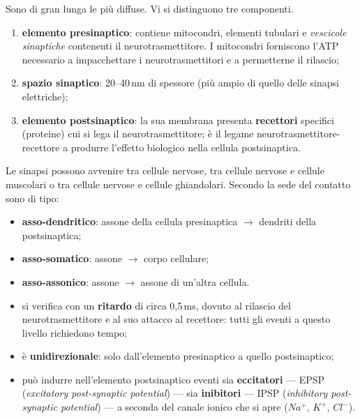Sono di gran lunga le più diffuse. Vi si distinguono tre componenti.
\begin{enumerate}
  \item \textbf{elemento presinaptico}: contiene mitocondri, elementi tubulari e \textit{vescicole
    sinaptiche} contenenti il neurotrasmettitore. I mitocondri forniscono l'ATP necessario a
    impacchettare i neurotrasmettitori e a permetterne il rilascio;
  \item \textbf{spazio sinaptico}: 20--40\,nm di spessore (più ampio di quello delle sinapsi
    elettriche);
  \item \textbf{elemento postsinaptico}: la sua membrana presenta \textbf{recettori} specifici
    (proteine) cui si lega il neurotrasmettitore; è il legame neurotrasmettitore-recettore a
    produrre l'effetto biologico nella cellula postsinaptica.
\end{enumerate}

Le sinapsi possono avvenire tra cellule nervose, tra cellule nervose e cellule muscolari o tra
cellule nervose e cellule ghiandolari. Secondo la sede del contatto sono di tipo:
\begin{itemize}
  \item \textbf{asso-dendritico}: assone della cellula presinaptica $\rightarrow$ dendriti della
    postsinaptica;
  \item \textbf{asso-somatico}: assone $\rightarrow$ corpo cellulare;
  \item \textbf{asso-assonico}: assone $\rightarrow$ assone di un'altra cellula.
\end{itemize}

\begin{itemize}
  \item si verifica con un \textbf{ritardo} di circa 0,5\,ms, dovuto al rilascio del
    neurotrasmettitore e al suo attacco al recettore: tutti gli eventi a questo livello richiedono
    tempo;
  \item è \textbf{unidirezionale}: solo dall'elemento presinaptico a quello postsinaptico;
  \item può indurre nell'elemento postsinaptico eventi sia \textbf{eccitatori} --- EPSP
    (\textit{excitatory post-synaptic potential}) --- sia \textbf{inibitori} --- IPSP
    (\textit{inhibitory post-synaptic potential}) --- a seconda del canale ionico che si apre
    ($Na^+$, $K^+$, $Cl^-$).
\end{itemize}

